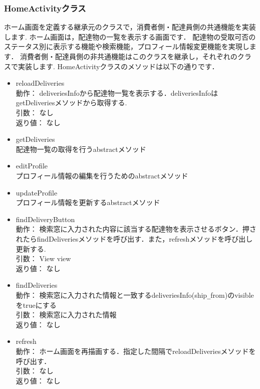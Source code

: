 \documentclass[a4j,titlepage]{jarticle}
\begin{document}
\subsubsection{HomeActivityクラス}
ホーム画面を定義する継承元のクラスで，消費者側・配達員側の共通機能を実装します.
ホーム画面は，配達物の一覧を表示する画面です．
配達物の受取可否のステータス別に表示する機能や検索機能，プロフィール情報変更機能を実現します．
消費者側・配達員側の非共通機能はこのクラスを継承し，それぞれのクラスで実装します.
HomeActivityクラスのメソッドは以下の通りです．
\begin{itemize}
\item reloadDeliveries\\
  動作： deliveriesInfoから配達物一覧を表示する．deliveriesInfoはgetDeliveriesメソッドから取得する.\\
  引数： なし\\
  返り値： なし

  \item getDeliveries\\
   配達物一覧の取得を行うabstractメソッド\\

  \item editProfile\\
   プロフィール情報の編集を行うためのabstractメソッド\\

  \item updateProfile\\
    プロフィール情報を更新するabstractメソッド\\

  \item findDeliveryButton\\
  動作：  検索窓に入力された内容に該当する配達物を表示させるボタン．押されたらfindDeliveriesメソッドを呼び出す．また，refreshメソッドを呼び出し更新する.\\
  引数：  View view\\
  返り値：  なし

  \item findDeliveries\\
  動作：  検索窓に入力された情報と一致するdeliveriesInfo(ship\verb|_|from)のvisibleをtrueにする\\
  引数：  検索窓に入力された情報\\
  返り値：  なし
　
  \item refresh\\
  動作：  ホーム画面を再描画する．指定した間隔でreloadDeliveriesメソッドを呼び出す．\\
  引数：  なし\\
  返り値：  なし


\end{itemize}
\end{document}
